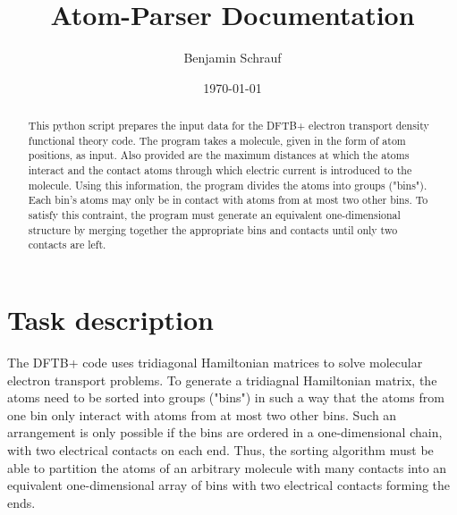 \documentclass[11pt,a4paper]{article}
\begin{document}
\renewcommand{\thefootnote}{\fnsymbol{footnote}}
%
\newcommand {\D} {\frac {d}        {d z}     } %
\newcommand {\DD}{\frac {d^{2}}    {d z^{2}} }
%
%
\newcommand {\dt} {\frac {\partial }{\partial t } }
\newcommand {\dx} {\frac {\partial }{\partial x } }
\newcommand {\dy} {\frac {\partial }{\partial y } }
\newcommand {\dz} {\frac {\partial }{\partial z } }
%
\newcommand {\h} {\widehat   }                 %
\newcommand {\T} {\widetilde }                 %
%

\renewcommand{\abstractname}{Overview}



\title{Atom-Parser Documentation}
\author{Benjamin Schrauf}
\date{\today}

\maketitle

\begin{abstract}
This python script prepares the input data for the DFTB+ electron transport density functional theory code. The program takes a molecule, given in the form of atom positions, as input. Also provided are the maximum distances at which the atoms interact and the contact atoms through which electric current is introduced to the molecule. Using this information, the program divides the atoms into groups ("bins"). Each bin's atoms may only be in contact with atoms from at most two other bins. To satisfy this contraint, the program must generate an equivalent one-dimensional structure by merging together the appropriate bins and contacts until only two contacts are left.
\end{abstract}



\newpage


\section{Task description}

The DFTB+ code uses tridiagonal Hamiltonian matrices to solve molecular electron transport problems. To generate a tridiagnal Hamiltonian matrix, the atoms need to be sorted into groups ("bins") in such a way that the atoms from one bin only interact with atoms from at most two other bins. Such an arrangement is only possible if the bins are ordered in a one-dimensional chain, with two electrical contacts on each end. Thus, the sorting algorithm must be able to partition the atoms of an arbitrary molecule with many contacts into an equivalent one-dimensional array of bins with two electrical contacts forming the ends.
\end{document}
